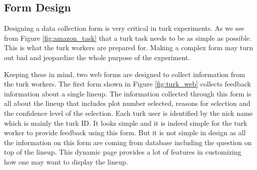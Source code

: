 \documentclass[11pt]{article}
\begin{document}

\subsection{Form Design}

Designing a data collection form is very critical in turk experiments. As we see from Figure \ref{fig:amazon_task} that a turk task needs to be as simple as possible. This is what the turk workers are prepared for. Making a complex form may turn out bad and jeopardize the whole purpose of the experiment. 

Keeping these in mind, two web forms are designed to collect information from the turk workers. The first form shown in Figure \ref{fig:turk_web} collects feedback information about a single lineup. The information collected through this form is all about the lineup that includes plot number selected, reasons for selection and the confidence level of the selection. Each turk user is identified by the nick name which is mainly the turk ID. It looks simple and it is indeed simple for the turk worker to provide feedback using this form. But it is not simple in design as all the information on this form are coming from database including the question on top of the lineup. This dynamic page provides a lot of features in customizing how one may want to display the lineup.
\end{document}
